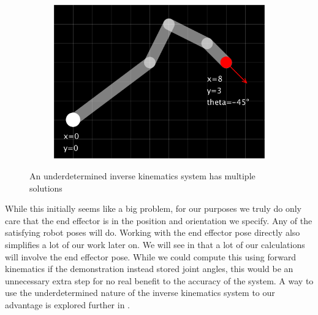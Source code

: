 \begin{figure}[h]
\begin{subfigure}[b]{0.32\textwidth}
        \includegraphics[width=\textwidth]{figures/ik_multi-3.png}
    \end{subfigure}
    \caption{An underdetermined inverse kinematics system has multiple solutions}
    \label{fig:underdetermined}
\end{figure}

While this initially seems like a big problem, for our purposes we truly do only care that the end effector is in the position and orientation we specify. Any of the satisfying robot poses will do. Working with the end effector pose directly also simplifies a lot of our work later on. We will see in  that a lot of our calculations will involve the end effector pose. While we could compute this using forward kinematics if the demonstration instead stored joint angles, this would be an unnecessary extra step for no real benefit to the accuracy of the system. A way to use the underdetermined nature of the inverse kinematics system to our advantage is explored further in .\\

